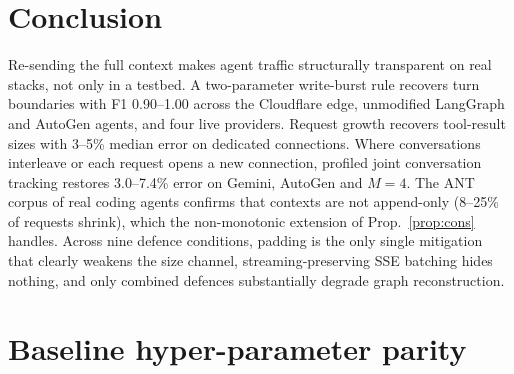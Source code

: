\documentclass[journal]{IEEEtran}
\begin{document}
\section{Conclusion}
Re-sending the full context makes agent traffic structurally transparent on real stacks, not only in a testbed. A two-parameter write-burst rule recovers turn boundaries with F1 0.90--1.00 across the Cloudflare edge, unmodified LangGraph and AutoGen agents, and four live providers. Request growth recovers tool-result sizes with 3--5\% median error on dedicated connections. Where conversations interleave or each request opens a new connection, profiled joint conversation tracking restores 3.0--7.4\% error on Gemini, AutoGen and $M{=}4$. The ANT corpus of real coding agents confirms that contexts are not append-only (8--25\% of requests shrink), which the non-monotonic extension of Prop.~\ref{prop:cons} handles. Across nine defence conditions, padding is the only single mitigation that clearly weakens the size channel, streaming-preserving SSE batching hides nothing, and only combined defences substantially degrade graph reconstruction.

\appendices
\section{Baseline hyper-parameter parity}\label{app:parity}
\end{document}
